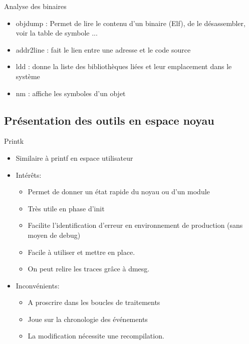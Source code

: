 \begin{frame}{Analyse des binaires}
	\begin{itemize}
	 	\item
	 		objdump : Permet de lire le contenu d'un binaire (Elf), de le désassembler, voir la table de symbole ...
	 	\item
	 		addr2line : fait le lien entre une adresse et le code source
	 	\item
	 		ldd : donne la liste des bibliothèques liées et leur emplacement dans le système
	 	\item
	 		nm : affiche les symboles d'un objet
	\end{itemize}
\end{frame}


\subsection{Présentation des outils en espace noyau}

\begin{frame}{Printk}
	\begin{itemize}
		\item
			Similaire à printf en espace utilisateur
		\item
			Intérêts:
			\begin{itemize}
				\item
					Permet de donner un état rapide du noyau ou d'un module
				\item
					Très utile en phase d'init 
				\item
					Facilite l'identification d'erreur en environnement de production (sans moyen de debug)
				\item
					Facile à utiliser et mettre en place.
				\item
					On peut relire les traces grâce à dmesg.
			\end{itemize}
		\item
			Inconvénients:
				\begin{itemize}
					\item
						A proscrire dans les boucles de traitements
					\item
						Joue sur la chronologie des événements
					\item
						La modification nécessite une recompilation.
				\end{itemize}
	\end{itemize}
\end{frame}

